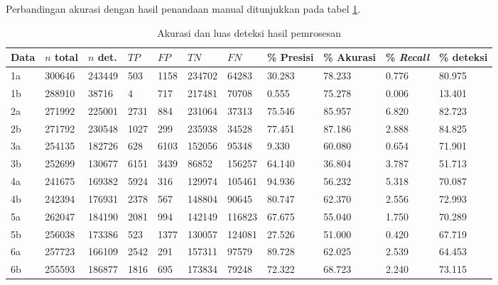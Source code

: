 \documentclass[laporan.tex]{subfiles}
\begin{document}
Perbandingan akurasi dengan hasil penandaan manual ditunjukkan pada tabel \ref{table:detconfuse}.

\begin{table}[h!]
\tiny
\centering
\begin{tabular} {|l|l|l|l|l|l|l|l|l|l|l|}
\hline
Data & $n$ total & $n$ det.&  $TP$ & $FP$ & $TN$ & $FN$ & \% Presisi & \% Akurasi & \% \emph{Recall} & \% deteksi \\
\hline
1a & 300646&243449&503&1158&234702&64283&30.283&78.233&0.776&80.975 \\
1b & 288910&38716&4&717&217481&70708&0.555&75.278&0.006&13.401 \\
2a & 271992&225001&2731&884&231064&37313&75.546&85.957&6.820&82.723 \\
2b & 271792&230548&1027&299&235938&34528&77.451&87.186&2.888&84.825 \\
3a & 254135&182726&628&6103&152056&95348&9.330&60.080&0.654&71.901 \\
3b & 252699&130677&6151&3439&86852&156257&64.140&36.804&3.787&51.713 \\
4a & 241675&169382&5924&316&129974&105461&94.936&56.232&5.318&70.087 \\
4b & 242394&176931&2378&567&148804&90645&80.747&62.370&2.556&72.993 \\
5a & 262047&184190&2081&994&142149&116823&67.675&55.040&1.750&70.289 \\
5b & 256038&173386&523&1377&130057&124081&27.526&51.000&0.420&67.719 \\
6a & 257723&166109&2542&291&157311&97579&89.728&62.025&2.539&64.453 \\
6b & 255593&186877&1816&695&173834&79248&72.322&68.723&2.240&73.115 \\
\hline
\end{tabular}
\normalsize
\caption{Akurasi dan luas deteksi hasil pemrosesan}
\label{table:detconfuse}
\end{table}
\end{document}
